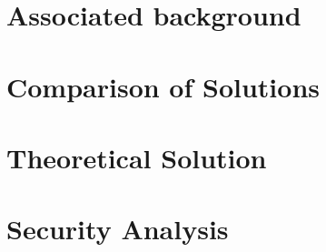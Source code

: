 \documentclass[10pt]{report}
\newif\ifnotesincluded
\begin{document}
\chapter{Associated background} \label{chapterBackground}




\chapter{Comparison of Solutions} \label{chapterComparison}




\chapter{Theoretical Solution} \label{chapterTheoreticalSolution}





\chapter{Security Analysis} \label{chapterSecurityAnalysis}



\fi


\ifnotesincluded
\chapter{Practical Implementation} \label{chapterPracticalImplementation}

\chapter{Conclusion and Further Work} \label{chapterConclusion}
\fi

\begin{sloppypar}
\printbibliography
\end{sloppypar}
\end{document}
